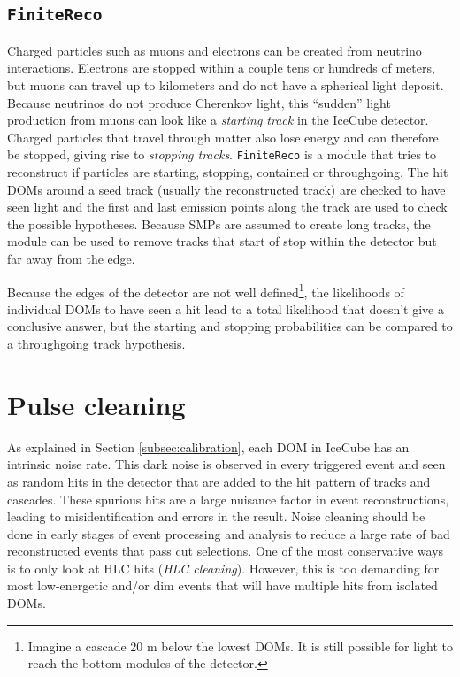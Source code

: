 \subsection{\texttt{FiniteReco}}
\label{subsec:finitereco}
Charged particles such as muons and electrons can be created from neutrino interactions. Electrons are stopped within a couple tens or hundreds of meters, but muons can travel up to kilometers and do not have a spherical light deposit. Because neutrinos do not produce Cherenkov light, this ``sudden'' light production from muons can look like a \textit{starting track} in the IceCube detector. Charged particles that travel through matter also lose energy and can therefore be stopped, giving rise to \textit{stopping tracks}. \texttt{FiniteReco} is a module that tries to reconstruct if particles are starting, stopping, contained or throughgoing. The hit DOMs around a seed track (usually the reconstructed track) are checked to have seen light and the first and last emission points along the track are used to check the possible hypotheses. Because SMPs are assumed to create long tracks, the module can be used to remove tracks that start of stop within the detector but far away from the edge. 

Because the edges of the detector are not well defined\footnote{Imagine a cascade 20 m below the lowest DOMs. It is still possible for light to reach the bottom modules of the detector.}, the likelihoods of individual DOMs to have seen a hit lead to a total likelihood that doesn't give a conclusive answer, but the starting and stopping probabilities can be compared to a throughgoing track hypothesis.

\section{Pulse cleaning}
\label{sec:pulsecleaning}
As explained in Section \ref{subsec:calibration}, each DOM in IceCube has an intrinsic noise rate. This dark noise is observed in every triggered event and seen as random hits in the detector that are added to the hit pattern of tracks and cascades. These spurious hits are a large nuisance factor in event reconstructions, leading to misidentification and errors in the result. Noise cleaning should be done in early stages of event processing and analysis to reduce a large rate of bad reconstructed events that pass cut selections. One of the most conservative ways is to only look at HLC hits (\textit{HLC cleaning}). However, this is too demanding for most low-energetic and/or dim events that will have multiple hits from isolated DOMs. 

